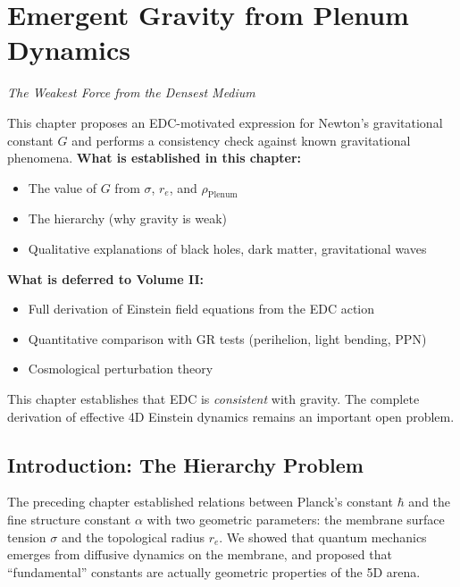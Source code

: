 \chapter{Emergent Gravity from Plenum Dynamics}
\label{ch:gravity}

\begin{center}
\textit{The Weakest Force from the Densest Medium}
\end{center}

\vspace{1em}

\begin{tcolorbox}[colback=yellow!5,colframe=yellow!50!black,title=Scope of This Chapter]
This chapter proposes an EDC-motivated expression for Newton's gravitational constant $G$ and performs a consistency check against known gravitational phenomena. \textbf{What is established in this chapter:}
\begin{itemize}
    \item The value of $G$ from $\sigma$, $r_e$, and $\rho_{\text{Plenum}}$
    \item The hierarchy (why gravity is weak)
    \item Qualitative explanations of black holes, dark matter, gravitational waves
\end{itemize}

\textbf{What is deferred to Volume II:}
\begin{itemize}
    \item Full derivation of Einstein field equations from the EDC action
    \item Quantitative comparison with GR tests (perihelion, light bending, PPN)
    \item Cosmological perturbation theory
\end{itemize}

This chapter establishes that EDC is \textit{consistent} with gravity. The complete derivation of effective 4D Einstein dynamics remains an important open problem.
\end{tcolorbox}

\section{Introduction: The Hierarchy Problem}
\label{sec:grav_intro}

The preceding chapter established relations between Planck's constant $\hbar$ and the fine structure constant $\alpha$ with two geometric parameters: the membrane surface tension $\sigma$ and the topological radius $r_e$. We showed that quantum mechanics emerges from diffusive dynamics on the membrane, and proposed that ``fundamental'' constants are actually geometric properties of the 5D arena.

